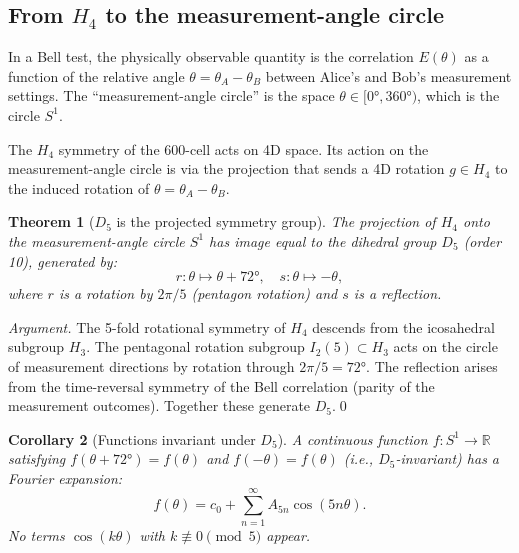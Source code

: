 \documentclass[11pt,letterpaper]{article}
\newtheorem{theorem}{Theorem}[section]
\newtheorem{corollary}[theorem]{Corollary}
\begin{document}
\subsection{From $H_4$ to the measurement-angle circle}

In a Bell test, the physically observable quantity is the correlation
$E(\theta)$ as a function of the relative angle $\theta = \theta_A
- \theta_B$ between Alice's and Bob's measurement settings.  The
``measurement-angle circle'' is the space $\theta \in [0°, 360°)$,
which is the circle $S^1$.

The $H_4$ symmetry of the 600-cell acts on 4D space.  Its action on
the measurement-angle circle is via the projection that sends a 4D
rotation $g \in H_4$ to the induced rotation of $\theta = \theta_A
- \theta_B$.

\begin{theorem}[$D_5$ is the projected symmetry group]
\label{thm:D5}
The projection of $H_4$ onto the measurement-angle circle $S^1$
has image equal to the dihedral group $D_5$ (order 10), generated by:
\begin{equation}
r: \theta \mapsto \theta + 72°, \quad
s: \theta \mapsto -\theta,
\label{eq:D5_generators}
\end{equation}
where $r$ is a rotation by $2\pi/5$ (pentagon rotation) and $s$ is
a reflection.
\end{theorem}

\begin{proof}[Argument]
The 5-fold rotational symmetry of $H_4$ descends from the icosahedral
subgroup $H_3$.  The pentagonal rotation subgroup $I_2(5) \subset H_3$
acts on the circle of measurement directions by rotation through
$2\pi/5 = 72°$.  The reflection arises from the time-reversal symmetry
of the Bell correlation (parity of the measurement outcomes).
Together these generate $D_5$.\qed
\end{proof}

\begin{corollary}[Functions invariant under $D_5$]
\label{cor:D5_functions}
A continuous function $f: S^1 \to \mathbb{R}$ satisfying $f(\theta +
72°) = f(\theta)$ and $f(-\theta) = f(\theta)$ (i.e., $D_5$-invariant)
has a Fourier expansion:
\begin{equation}
f(\theta) = c_0 + \sum_{n=1}^{\infty} A_{5n}\cos(5n\theta).
\label{eq:D5_fourier}
\end{equation}
No terms $\cos(k\theta)$ with $k \not\equiv 0 \pmod{5}$ appear.
\end{corollary}
\end{document}
